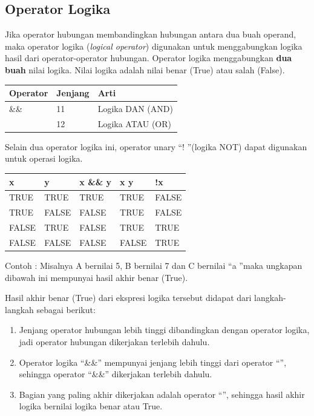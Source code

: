 \subsection{Operator Logika}\label{f-operator-logika}

Jika operator hubungan membandingkan hubungan antara dua buah operand,
maka operator logika (\emph{logical operator}) digunakan untuk
menggabungkan logika hasil dari operator-operator hubungan. Operator
logika menggabungkan \textbf{dua buah} nilai logika. Nilai logika adalah
nilai benar (True) atau salah (False).

\begin{longtable}[]{@{}lll@{}}
\toprule
Operator & Jenjang & Arti\tabularnewline
\midrule
\endhead
\&\& & 11 & Logika DAN (AND)\tabularnewline
\texttt{\textbar{}\textbar{}} & 12 & Logika ATAU (OR)\tabularnewline
\bottomrule
\end{longtable}

Selain dua operator logika ini, operator unary \textquotedblleft ! \textquotedblright (logika NOT) dapat digunakan untuk operasi logika.

\begin{longtable}[]{@{}lllll@{}}
\toprule
x & y & x \&\& y & x \texttt{\textbar{}\textbar{}} y & !x\tabularnewline
\midrule
\endhead
TRUE & TRUE & TRUE & TRUE & FALSE\tabularnewline
TRUE & FALSE & FALSE & TRUE & FALSE\tabularnewline
FALSE & TRUE & FALSE & TRUE & TRUE\tabularnewline
FALSE & FALSE & FALSE & FALSE & TRUE\tabularnewline
\bottomrule
\end{longtable}

Contoh : Misalnya A bernilai 5, B bernilai 7 dan C bernilai \textquotedblleft a \textquotedblright maka ungkapan dibawah ini mempunyai hasil akhir benar (True).



Hasil akhir benar (True) dari ekspresi logika tersebut didapat dari
langkah-langkah sebagai berikut:

\begin{enumerate}


\item
 Jenjang operator hubungan lebih tinggi dibandingkan dengan operator
 logika, jadi operator hubungan dikerjakan terlebih dahulu.
\item
 Operator logika ``\&\&'' mempunyai jenjang lebih tinggi dari operator
 ``\textbar{}\textbar{}'', sehingga operator ``\&\&'' dikerjakan
 terlebih dahulu.
\item
 Bagian yang paling akhir dikerjakan adalah operator
 ``\textbar{}\textbar{}'', sehingga hasil akhir logika bernilai logika
 benar atau True.
\end{enumerate}


